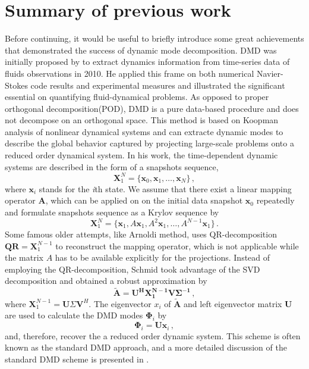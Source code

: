 \section{Summary of previous work}
Before continuing, it would be useful to briefly introduce some great achievements that demonstrated the success of dynamic mode decomposition.
DMD was initially proposed by \citet{schmid_dynamic_2010}\cite{schmid_applications_2011} to extract dynamics information from time-series data of fluids observations in 2010.
He applied this frame on both numerical Navier-Stokes code results and experimental measures and illustrated the significant essential on quantifying fluid-dynamical problems.
As opposed to proper orthogonal decomposition(POD), DMD is a pure data-based procedure and does not decompose on an orthogonal space. 
This method is based on Koopman analysis of nonlinear dynamical systems and can extracte dynamic modes to describe the global behavior captured by projecting large-scale problems onto a reduced order dynamical system.
In his work, the time-dependent dynamic systems are described in the form of a snapshots sequence,
\begin{equation}
 \mathbf{X}^{N}_1 = \{\mathbf{x}_0, \mathbf{x}_1, \ldots, \mathbf{x}_{N} \} \, ,
 \label{eq:snap_matrix}
\end{equation}
where $\mathbf{x}_i$ stands for the {\it i}th state.
We assume that there exist a linear mapping operator $\mathbf{A}$, which can be applied on on the initial data snapshot $\mathbf{x}_0$ repeatedly and formulate snapshots sequence  as a Krylov sequence by
\begin{equation}
 \mathbf{X}^{N}_1 = \{\mathbf{x}_1,A\mathbf{x}_1,A^2\mathbf{x}_1,…,A^{N-1}\mathbf{x}_1 \} \, .
 \label{eq:Krylov_seq}
\end{equation}
Some famous older attempts, like Arnoldi method, uses QR-decomposition $\mathbf{QR} = \mathbf{X}^{N-1}_1$ to reconstruct the mapping operator, which is not applicable while the matrix $A$ has to be available explicitly for the projections.\cite{Greenbaum_1997}  \cite{trefethen1997numerical}
Instead of employing the QR-decomposition, Schmid took advantage of the SVD decomposition and obtained a robust approximation by 
\begin{equation}
\mathbf{\tilde{A}} = \mathbf{U^H X_1^{N-1}V\Sigma^{-1}} \, ,
 \label{eq:stanard_DMD}
\end{equation}
where $\mathbf{X}_1^{N-1} = \mathbf{U}\Sigma \mathbf{V}^H$. 
The eigenvector $x_i$ of $\mathbf{\tilde{A}}$ and left eigenvector matrix $\mathbf{U}$ are used to calculate the DMD modes $\mathbf{\Phi}_i$ by 
\begin{equation}
\mathbf{\Phi}_i = \mathbf{U} \mathbf{x}_i \, ,
 \label{eq:dyanmic_modes}
\end{equation}
and, therefore, recover the a reduced order dynamic system.
This scheme is often known as the standard DMD approach, and a more detailed discussion of the standard DMD scheme is presented in .   

